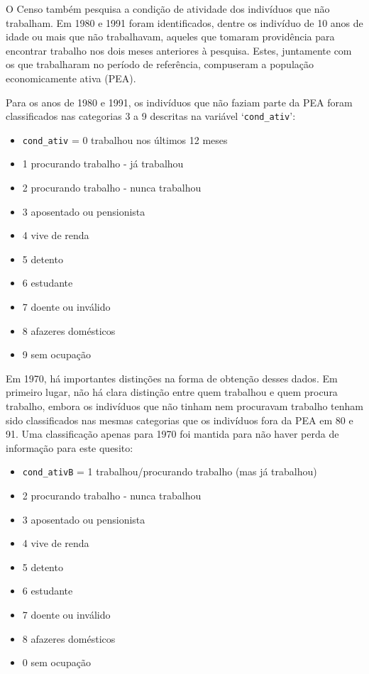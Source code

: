 \documentclass[12pt,a4paper]{article}
\newcommand{\vr}[1]{\texttt{#1}}
\begin{document}
O Censo também pesquisa a condição de atividade dos indivíduos que não trabalham. Em 1980 e 1991 foram identificados, dentre os indivíduo de 10 anos de idade ou mais que não trabalhavam, aqueles que tomaram providência para encontrar trabalho nos dois meses anteriores à pesquisa. Estes, juntamente com os que trabalharam no período de referência, compuseram a população economicamente ativa (PEA).

Para os anos de 1980 e 1991, os indivíduos que não faziam parte da PEA foram classificados nas categorias 3 a 9 descritas na variável ‘\vr{cond\_ativ}’:
\begin{itemize}
  \item \vr{cond\_ativ} = 0 trabalhou nos últimos 12 meses
  \item 1 procurando trabalho - já trabalhou
  \item 2 procurando trabalho - nunca trabalhou
  \item 3 aposentado ou pensionista
  \item 4 vive de renda
  \item 5 detento
  \item 6 estudante
  \item 7 doente ou inválido
  \item 8 afazeres domésticos
  \item 9 sem ocupação
\end{itemize}

Em 1970, há importantes distinções na forma de obtenção desses dados. Em primeiro lugar, não há clara distinção entre quem trabalhou e quem procura trabalho, embora os indivíduos que não tinham nem procuravam trabalho tenham sido classificados nas mesmas categorias que os indivíduos fora da PEA em 80 e 91. Uma classificação apenas para 1970 foi mantida para não haver perda de informação para este quesito:
\begin{itemize}
  \item \vr{cond\_ativB} = 1 trabalhou/procurando trabalho (mas já trabalhou)
  \item 2 procurando trabalho - nunca trabalhou
  \item 3 aposentado ou pensionista
  \item 4 vive de renda
  \item 5 detento
  \item 6 estudante
  \item 7 doente ou inválido
  \item 8 afazeres domésticos
  \item 0 sem ocupação
\end{itemize}
\end{document}
